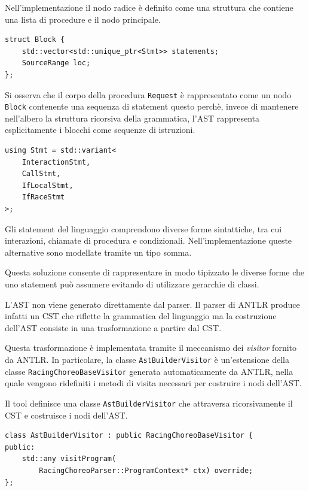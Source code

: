 Nell’implementazione il nodo radice è definito come una struttura che contiene una lista di procedure e il nodo principale.

\begin{tcolorbox}[colback=white,colframe=black!35,boxrule=0.4pt]
\begin{lstlisting}
struct Block {
    std::vector<std::unique_ptr<Stmt>> statements;
    SourceRange loc;
};
\end{lstlisting}
\end{tcolorbox}

Si osserva che il corpo della procedura \texttt{Request} è rappresentato come un nodo \texttt{Block} contenente una sequenza di statement questo perchè, invece di mantenere nell’albero la struttura ricorsiva della grammatica, l’AST rappresenta esplicitamente i blocchi come sequenze di istruzioni.

\begin{tcolorbox}[colback=white,colframe=black!35,boxrule=0.4pt]
\begin{lstlisting}
using Stmt = std::variant<
    InteractionStmt,
    CallStmt,
    IfLocalStmt,
    IfRaceStmt
>;
\end{lstlisting}
\end{tcolorbox}

Gli statement del linguaggio comprendono diverse forme sintattiche, tra cui interazioni, chiamate di procedura e condizionali. Nell’implementazione queste alternative sono modellate tramite un tipo somma.

Questa soluzione consente di rappresentare in modo tipizzato le diverse forme che uno statement può assumere evitando di utilizzare gerarchie di classi.

L’AST non viene generato direttamente dal parser. Il parser di ANTLR produce infatti un CST che riflette la grammatica del linguaggio ma la costruzione dell’AST consiste in una trasformazione a partire dal CST.

Questa trasformazione è implementata tramite il meccanismo dei \textit{visitor} fornito da ANTLR. In particolare, la classe \texttt{AstBuilderVisitor} è un’estensione della classe \texttt{RacingChoreoBaseVisitor} generata automaticamente da ANTLR, nella quale vengono ridefiniti i metodi di visita necessari per costruire i nodi dell’AST.

Il tool definisce una classe \texttt{AstBuilderVisitor} che attraversa ricorsivamente il CST e costruisce i nodi dell’AST.

\begin{tcolorbox}[colback=white,colframe=black!35,boxrule=0.4pt]
\begin{lstlisting}
class AstBuilderVisitor : public RacingChoreoBaseVisitor {
public:
    std::any visitProgram(
        RacingChoreoParser::ProgramContext* ctx) override;
};
\end{lstlisting}
\end{tcolorbox}

